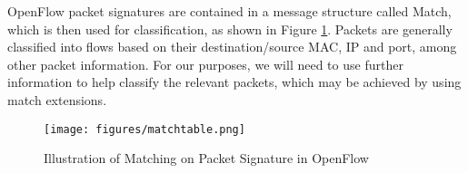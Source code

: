 OpenFlow packet signatures are contained in a message structure called Match, which is then used for classification, as shown in Figure \ref{fig:matchtable}. Packets are generally classified into flows based on their destination/source MAC, IP and port, among other packet information. For our purposes, we will need to use further information to help classify the relevant packets, which may be achieved by using match extensions. 

\setlength{\belowcaptionskip}{-10pt}

\begin{figure}[!h]
\centering
\texttt{[image: figures/matchtable.png]}
\caption{Illustration of Matching on Packet Signature in OpenFlow}
\label{fig:matchtable}
\end{figure}

\setlength{\belowcaptionskip}{0pt}

%




